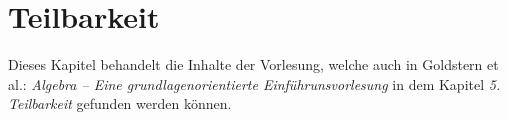 \chapter{Teilbarkeit}

Dieses Kapitel behandelt die Inhalte der Vorlesung, welche auch in Goldstern et al.: \textit{Algebra -- Eine grundlagenorientierte Einführunsvorlesung} in dem Kapitel \textit{5. Teilbarkeit} gefunden werden können.


